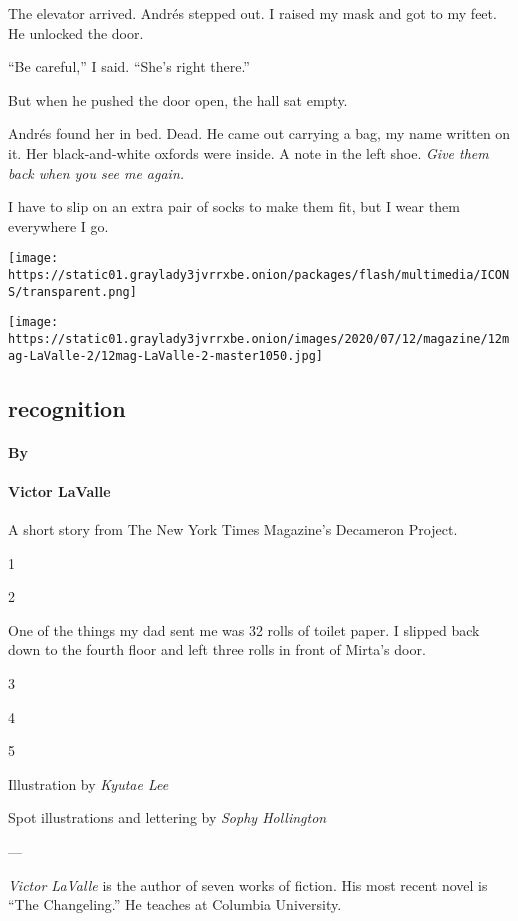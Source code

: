 The elevator arrived. Andrés stepped out. I raised my mask and got to my
feet. He unlocked the door.

``Be careful,'' I said. ``She's right there.''

But when he pushed the door open, the hall sat empty.

Andrés found her in bed. Dead. He came out carrying a bag, my name
written on it. Her black-and-white oxfords were inside. A note in the
left shoe. \emph{Give them back when you see me again.}

I have to slip on an extra pair of socks to make them fit, but I wear
them everywhere I go.

\texttt{[image: https://static01.graylady3jvrrxbe.onion/packages/flash/multimedia/ICONS/transparent.png]}

\texttt{[image: https://static01.graylady3jvrrxbe.onion/images/2020/07/12/magazine/12mag-LaValle-2/12mag-LaValle-2-master1050.jpg]}

\hypertarget{recognition}{%
\subsection{recognition}\label{recognition}}

\hypertarget{by}{%
\paragraph{By}\label{by}}

\hypertarget{victor-lavalle}{%
\paragraph{Victor LaValle}\label{victor-lavalle}}

A short story from The New York Times Magazine's Decameron Project.

1

2

One of the things my dad sent me was 32 rolls of toilet paper. I slipped
back down to the fourth floor and left three rolls in front of Mirta's
door.

3

4

5

Illustration by \emph{Kyutae Lee}

Spot illustrations and lettering by \emph{Sophy Hollington}

---

\emph{Victor LaValle} is the author of seven works of fiction. His most
recent novel is ``The Changeling.'' He teaches at Columbia University.

